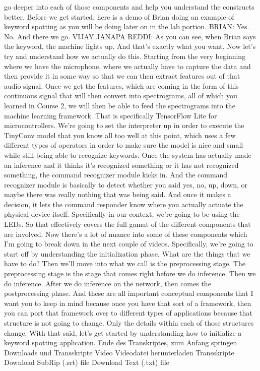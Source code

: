      go deeper into each of those components and help
     you understand the constructs better.
     Before we get started, here is a demo of Brian
     doing an example of keyword spotting as you will be doing later
     on in the lab portion.
     BRIAN: Yes.
     No.
     And there we go.
     VIJAY JANAPA REDDI: As you can see, when Brian says the keyword,
     the machine lights up.
     And that's exactly what you want.
     Now let's try and understand how we actually do this.
     Starting from the very beginning where we have the microphone, where
     we actually have to capture the data and then provide it in some way
     so that we can then extract features out of that audio signal.
     Once we get the features, which are coming
     in the form of this continuous signal that will then
     convert into spectrograms, all of which you learned in Course 2,
     we will then be able to feed the spectrograms
     into the machine learning framework.
     That is specifically TensorFlow Lite for microcontrollers.
     We're going to set the interpreter up in order to execute the TinyConv
     model that you know all too well at this point, which
     uses a few different types of operators in order
     to make sure the model is nice and small while still
     being able to recognize keywords.
     Once the system has actually made an inference
     and it thinks it's recognized something or it has not recognized something,
     the command recognizer module kicks in.
     And the command recognizer module is basically
     to detect whether you said yes, no, up, down,
     or maybe there was really nothing that was being said.
     And once it makes a decision, it lets the command responder
     know where you actually actuate the physical device itself.
     Specifically in our context, we're going to be using the LEDs.
     So that effectively covers the full gamut of the different components
     that are involved.
     Now there's a lot of nuance into some of these components which
     I'm going to break down in the next couple of videos.
     Specifically, we're going to start off by understanding the initialization
     phase.
     What are the things that we have to do?
     Then we'll move into what we call is the preprocessing stage.
     The preprocessing stage is the stage that
     comes right before we do inference.
     Then we do inference.
     After we do inference on the network, then comes the postprocessing phase.
     And these are all important conceptual components
     that I want you to keep in mind because once you have that sort of a framework,
     then you can port that framework over to different types of applications
     because that structure is not going to change.
     Only the details within each of those structures change.
     With that said, let's get started by understanding how to initialize
     a keyword spotting application.
     Ende des Transkriptes, zum Anfang springen
     Downloads und Transskripte
     Video
     Videodatei herunterladen
     Transskripte
     Download SubRip (.srt) file
     Download Text (.txt) file
     
